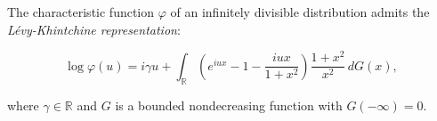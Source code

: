 The characteristic function $\varphi$ of an infinitely divisible distribution admits the \textit{Lévy-Khintchine representation}:

$$\log \varphi(u) = i\gamma u + \int_{\mathbb{R}} \left(e^{iux} - 1 - \frac{iux}{1+x^2}\right) \frac{1+x^2}{x^2} \, dG(x),$$

where $\gamma \in \mathbb{R}$ and $G$ is a bounded nondecreasing function with $G(-\infty) = 0$.
